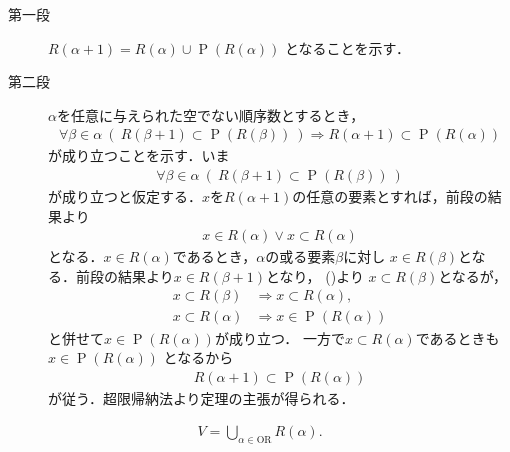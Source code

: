 	\begin{prf}\mbox{}
		\begin{description}
			\item[第一段] $R(\alpha + 1) = R(\alpha) \cup \operatorname{P}(R(\alpha))$
				となることを示す．
				
			\item[第二段] $\alpha$を任意に与えられた空でない順序数とするとき，
				\begin{align}
					\forall \beta \in \alpha\ 
					\left(\ R(\beta + 1) \subset \operatorname{P}(R(\beta))\ \right)
					\Longrightarrow R(\alpha + 1) \subset \operatorname{P}(R(\alpha))
				\end{align}
				が成り立つことを示す．いま
				\begin{align}
					\forall \beta \in \alpha\ 
					\left(\ R(\beta + 1) \subset \operatorname{P}(R(\beta))\ \right)
					\label{eq:thm_R_alpha_plus_1_equals_to_power_of_R_alpha}
				\end{align}
				が成り立つと仮定する．$x$を$R(\alpha + 1)$の任意の要素とすれば，前段の結果より
				\begin{align}
					x \in R(\alpha) \vee x \subset R(\alpha)
				\end{align}
				となる．$x \in R(\alpha)$であるとき，$\alpha$の或る要素$\beta$に対し
				$x \in R(\beta)$となる．前段の結果より$x \in R(\beta + 1)$となり，
				()より
				$x \subset R(\beta)$となるが，
				\begin{align}
					x \subset R(\beta) &\Longrightarrow x \subset R(\alpha), \\
					x \subset R(\alpha) &\Longrightarrow x \in \operatorname{P}(R(\alpha))
				\end{align}
				と併せて$x \in \operatorname{P}(R(\alpha))$が成り立つ．
				一方で$x \subset R(\alpha)$であるときも$x \in \operatorname{P}(R(\alpha))$
				となるから
				\begin{align}
					R(\alpha + 1) \subset \operatorname{P}(R(\alpha))
				\end{align}
				が従う．超限帰納法より定理の主張が得られる．
		\end{description}
	\end{prf}
	
	\begin{screen}
		\begin{thm}
			\begin{align}
				V = \bigcup_{\alpha \in \mathrm{OR}} R(\alpha).
			\end{align}
		\end{thm}
	\end{screen}
	
